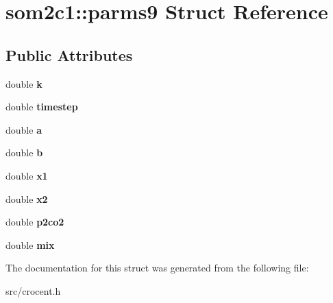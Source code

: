 \hypertarget{structsom2c1_1_1parms9}{\section{som2c1\-:\-:parms9 Struct Reference}
\label{structsom2c1_1_1parms9}
}
\subsection*{Public Attributes}
\begin{DoxyCompactItemize}
\item 
\hypertarget{structsom2c1_1_1parms9_a2acd09d6635266196d902b10dcfaa685}{double {\bfseries k}}\label{structsom2c1_1_1parms9_a2acd09d6635266196d902b10dcfaa685}

\item 
\hypertarget{structsom2c1_1_1parms9_a0a067e7d2dcae5c94aa1e7b6f89a0d3b}{double {\bfseries timestep}}\label{structsom2c1_1_1parms9_a0a067e7d2dcae5c94aa1e7b6f89a0d3b}

\item 
\hypertarget{structsom2c1_1_1parms9_a84706c5fb1e4d50879b888d22239a14c}{double {\bfseries a}}\label{structsom2c1_1_1parms9_a84706c5fb1e4d50879b888d22239a14c}

\item 
\hypertarget{structsom2c1_1_1parms9_a988ca3abf32ccd1a342b7009c18914f2}{double {\bfseries b}}\label{structsom2c1_1_1parms9_a988ca3abf32ccd1a342b7009c18914f2}

\item 
\hypertarget{structsom2c1_1_1parms9_a13ba4f2c769cbebdf482e4c257720d53}{double {\bfseries x1}}\label{structsom2c1_1_1parms9_a13ba4f2c769cbebdf482e4c257720d53}

\item 
\hypertarget{structsom2c1_1_1parms9_a1f6b1b80c3d8e4262df69ecfc7510b80}{double {\bfseries x2}}\label{structsom2c1_1_1parms9_a1f6b1b80c3d8e4262df69ecfc7510b80}

\item 
\hypertarget{structsom2c1_1_1parms9_a7c958d50367f89aa55b2dc583ee565ec}{double {\bfseries p2co2}}\label{structsom2c1_1_1parms9_a7c958d50367f89aa55b2dc583ee565ec}

\item 
\hypertarget{structsom2c1_1_1parms9_af26c226970ad02af8171c9dce56e79f3}{double {\bfseries mix}}\label{structsom2c1_1_1parms9_af26c226970ad02af8171c9dce56e79f3}

\end{DoxyCompactItemize}


The documentation for this struct was generated from the following file\-:\begin{DoxyCompactItemize}
\item 
src/crocent.\-h\end{DoxyCompactItemize}

